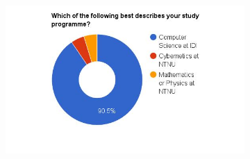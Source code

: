 \begin{figure}
\begin{subfigure}[h]{0.5\textwidth}
        \includegraphics[width=1.5\textwidth, height=1.0\textwidth]{results/study_programme.jpg}
        \caption{}
        \label{fig:study-programme}
    \end{subfigure}


\end{figure}
